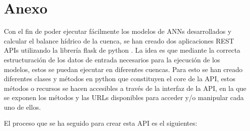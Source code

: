 \chapter{Anexo}
\label{Desarrollo}
Con el fin de poder ejecutar fácilmente los modelos de ANNs desarrollados y calcular el balance hídrico de la cuenca, 
se han creado dos aplicaciones REST APIs utilizando la librería flask de python \cite{flask}. La idea 
es que mediante la correcta estructuración de los datos de entrada necesarios para la ejecución de los modelos, estos se puedan ejecutar en diferentes 
cuencas.
Para esto se han creado diferentes clases y métodos en python que constituyen el core de la API, estos métodos o recursos se hacen 
accesibles a través de la interfaz de la API, en la que se exponen los métodos y las URLs disponibles para acceder 
y/o manipular cada uno de ellos.


El proceso que se ha seguido para crear esta API es el siguientes:


